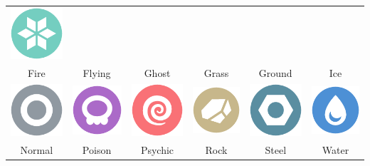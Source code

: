 \begin{table}[h]
\begin{tabular}{c c c c c c}
    \includegraphics[scale=.25]{images/ice.png} \\
  Fire & Flying & Ghost & Grass & Ground & Ice \\
  \includegraphics[scale=.25]{images/normal.png} &
    \includegraphics[scale=.25]{images/poison.png} &
    \includegraphics[scale=.25]{images/psychic.png} &
    \includegraphics[scale=.25]{images/rock.png} &
    \includegraphics[scale=.25]{images/steel.png} &
    \includegraphics[scale=.25]{images/water.png} \\
  Normal & Poison & Psychic & Rock & Steel & Water \\
\end{tabular}
\end{table}
